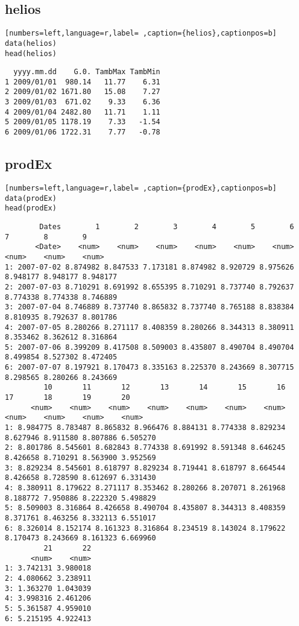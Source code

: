 \subsection{helios}
\label{sec:orgabbe1a6}
\label{subsec:helios}
\begin{lstlisting}[numbers=left,language=r,label= ,caption={helios},captionpos=b]
data(helios)
head(helios)
\end{lstlisting}

\begin{verbatim}
  yyyy.mm.dd    G.0. TambMax TambMin
1 2009/01/01  980.14   11.77    6.31
2 2009/01/02 1671.80   15.08    7.27
3 2009/01/03  671.02    9.33    6.36
4 2009/01/04 2482.80   11.71    1.11
5 2009/01/05 1178.19    7.33   -1.54
6 2009/01/06 1722.31    7.77   -0.78
\end{verbatim}

\subsection{prodEx}
\label{sec:org3b5c3b4}
\label{subsec:prodex}
\begin{lstlisting}[numbers=left,language=r,label= ,caption={prodEx},captionpos=b]
data(prodEx)
head(prodEx)
\end{lstlisting}

\begin{verbatim}
        Dates        1        2        3        4        5        6        7        8        9
       <Date>    <num>    <num>    <num>    <num>    <num>    <num>    <num>    <num>    <num>
1: 2007-07-02 8.874982 8.847533 7.173181 8.874982 8.920729 8.975626 8.948177 8.948177 8.948177
2: 2007-07-03 8.710291 8.691992 8.655395 8.710291 8.737740 8.792637 8.774338 8.774338 8.746889
3: 2007-07-04 8.746889 8.737740 8.865832 8.737740 8.765188 8.838384 8.810935 8.792637 8.801786
4: 2007-07-05 8.280266 8.271117 8.408359 8.280266 8.344313 8.380911 8.353462 8.362612 8.316864
5: 2007-07-06 8.399209 8.417508 8.509003 8.435807 8.490704 8.490704 8.499854 8.527302 8.472405
6: 2007-07-07 8.197921 8.170473 8.335163 8.225370 8.243669 8.307715 8.298565 8.280266 8.243669
         10       11       12       13       14       15       16       17       18       19       20
      <num>    <num>    <num>    <num>    <num>    <num>    <num>    <num>    <num>    <num>    <num>
1: 8.984775 8.783487 8.865832 8.966476 8.884131 8.774338 8.829234 8.627946 8.911580 8.807886 6.505270
2: 8.801786 8.545601 8.682843 8.774338 8.691992 8.591348 8.646245 8.426658 8.710291 8.563900 3.952569
3: 8.829234 8.545601 8.618797 8.829234 8.719441 8.618797 8.664544 8.426658 8.728590 8.612697 6.331430
4: 8.380911 8.179622 8.271117 8.353462 8.280266 8.207071 8.261968 8.188772 7.950886 8.222320 5.498829
5: 8.509003 8.316864 8.426658 8.490704 8.435807 8.344313 8.408359 8.371761 8.463256 8.332113 6.551017
6: 8.326014 8.152174 8.161323 8.316864 8.234519 8.143024 8.179622 8.170473 8.243669 8.161323 6.669960
         21       22
      <num>    <num>
1: 3.742131 3.980018
2: 4.080662 3.238911
3: 1.363270 1.043039
4: 3.998316 2.461206
5: 5.361587 4.959010
6: 5.215195 4.922413
\end{verbatim}

